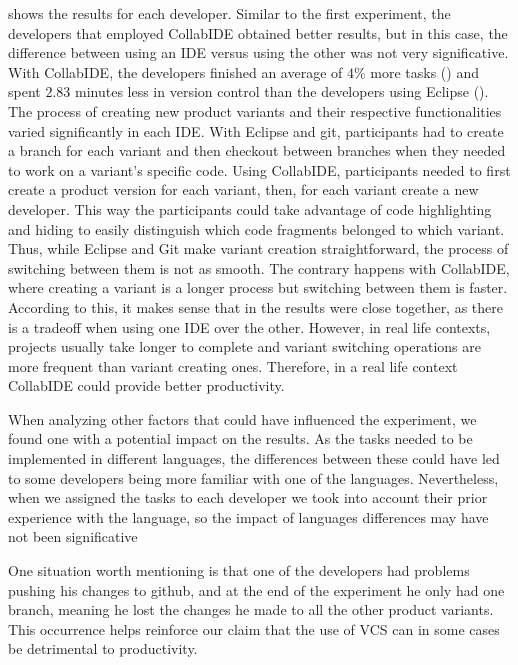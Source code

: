  shows the results for each developer. Similar to the first experiment, 
the developers that employed CollabIDE obtained better results, but in this case, the difference 
between using an IDE versus using the other was not very significative. With CollabIDE, the 
developers finished an average of $4\%$ more tasks () and spent 
$2.83$ minutes less in version control than the developers using Eclipse 
(). The process of creating new product variants and their 
respective functionalities varied significantly in each IDE. With Eclipse and git, participants had to 
create a branch for each variant and then checkout between branches when they needed to work on a 
variant’s specific code. Using CollabIDE, participants needed to first create a product version for each 
variant, then, for each variant create a new developer. This way the participants could take advantage 
of code highlighting and hiding to easily distinguish which code fragments belonged to which variant. 
Thus, while Eclipse and Git make variant creation straightforward, the process of switching between 
them is not as smooth. The contrary happens with CollabIDE, where creating a variant is a longer 
process but switching between them is faster. According to this, it makes sense that in the results 
were close together, as there is a tradeoff when using one IDE over the other. However, in real life 
contexts, projects usually take longer to complete and variant switching operations are more frequent 
than variant creating ones. Therefore, in a real life context CollabIDE could provide better productivity.

When analyzing other factors that could have influenced the experiment, we found one with a potential 
impact on the results. As the tasks needed to be implemented in different languages, the differences 
between these could have led to some developers being more familiar with one of the languages. 
Nevertheless, when we assigned the tasks to each developer we took into account their prior 
experience with the language, so the impact of languages differences may have not been significative

One situation worth mentioning is that one of the developers had problems pushing his changes to 
github, and at the end of the experiment he only had one branch, meaning he lost the changes he 
made to all the other product variants. This occurrence helps reinforce our claim that the use of 
\ac{VCS} can in some cases be detrimental to productivity.

